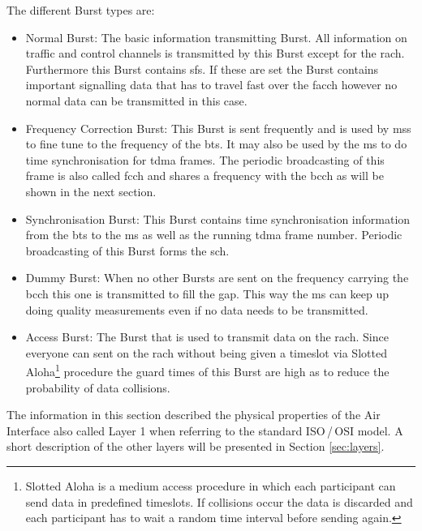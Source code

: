 The different Burst types are:
\begin{itemize}
	\item Normal Burst: The basic information transmitting Burst.
	All information on traffic and control channels is transmitted by this Burst except for the \gls{rach}.
	Furthermore this Burst contains \glspl{sf}.
	If these are set the Burst contains important signalling data that has to travel fast over the \gls{facch} however no normal data can be transmitted in this case.
	\item Frequency Correction Burst: This Burst is sent frequently and is used by \glspl{ms} to fine tune to the frequency of the \gls{bts}.
	It may also be used by the \gls{ms} to do time synchronisation for \gls{tdma} frames.
	The periodic broadcasting of this frame is also called \gls{fcch} and shares a frequency with the \gls{bcch} as will be shown in the next section.
	\item Synchronisation Burst: This Burst contains time synchronisation information from the \gls{bts} to the \gls{ms} as well as the running \gls{tdma} frame number.
	Periodic broadcasting of this Burst forms the \gls{sch}.
	\item Dummy Burst: When no other Bursts are sent on the frequency carrying the \gls{bcch} this one is transmitted to fill the gap.
	This way the \gls{ms} can keep up doing quality measurements even if no data needs to be transmitted.
	\item Access Burst: The Burst that is used to transmit data on the \gls{rach}.
	Since everyone can sent on the \gls{rach} without being given a timeslot via Slotted Aloha\footnote{Slotted Aloha is a medium access procedure in which each participant can send data in predefined timeslots. If collisions occur the data is discarded and each participant has to wait a random time interval before sending again.} procedure the guard times of this Burst are high as to reduce the probability of data collisions.
\end{itemize}
The information in this section described the physical properties of the Air Interface also called Layer 1 when referring to the standard ISO\,/\,OSI model.
A short description of the other layers will be presented in Section \ref{sec:layers}.

